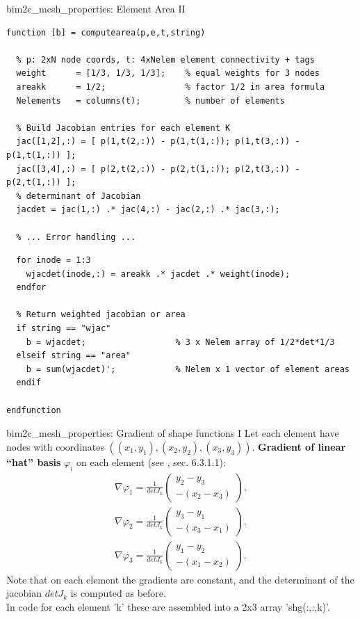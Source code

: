 \documentclass[aspectratio=54,xcolor=dvipsnames]{beamer}
\begin{document}
\begin{frame}[fragile]{bim2c\_mesh\_properties: Element Area II}
\scriptsize
\begin{lstlisting}[firstnumber=374]
function [b] = computearea(p,e,t,string)

  % p: 2xN node coords, t: 4xNelem element connectivity + tags
  weight      = [1/3, 1/3, 1/3];    % equal weights for 3 nodes
  areakk      = 1/2;                % factor 1/2 in area formula
  Nelements   = columns(t);         % number of elements
  
  % Build Jacobian entries for each element K
  jac([1,2],:) = [ p(1,t(2,:)) - p(1,t(1,:)); p(1,t(3,:)) - p(1,t(1,:)) ];
  jac([3,4],:) = [ p(2,t(2,:)) - p(2,t(1,:)); p(2,t(3,:)) - p(2,t(1,:)) ];
  % determinant of Jacobian
  jacdet = jac(1,:) .* jac(4,:) - jac(2,:) .* jac(3,:);   
  
  % ... Error handling ...
\end{lstlisting}
\begin{lstlisting}[firstnumber=400]
  % Weighted jacobian for each local node i
  for inode = 1:3
    wjacdet(inode,:) = areakk .* jacdet .* weight(inode);
  endfor
  
  % Return weighted jacobian or area
  if string == "wjac"
    b = wjacdet;                  % 3 x Nelem array of 1/2*det*1/3
  elseif string == "area"
    b = sum(wjacdet)';            % Nelem x 1 vector of element areas
  endif

endfunction
\end{lstlisting}
\end{frame}

\begin{frame}{bim2c\_mesh\_properties: Gradient of shape functions I}
\small
Let each element have nodes with coordinates $((x_1,y_1), (x_2,y_2), (x_3,y_3))$.
\textbf{Gradient of linear “hat” basis} \(\varphi_i\) on each element (see \cite{rylander2013}, sec. 6.3.1.1):
\begin{align*}
    \nabla\varphi_1 = \frac{1}{det J_k}
        \begin{pmatrix} y_2 - y_3 \\[3pt] -(x_2 - x_3) \end{pmatrix},
    \\
    \nabla\varphi_2 = \frac{1}{det J_k}
        \begin{pmatrix} y_3 - y_1 \\[3pt] -(x_3 - x_1) \end{pmatrix},
    \\
    \nabla\varphi_3 = \frac{1}{det J_k}
        \begin{pmatrix} y_1 - y_2 \\[3pt] -(x_1 - x_2) \end{pmatrix}.
\end{align*}
Note that on each element the gradients are constant, and the determinant of the jacobian $det J_k$ is computed as before. \\
In code for each element 'k' these are assembled into a 2x3 array 'shg(:,:,k)'.
\end{frame}
\end{document}
